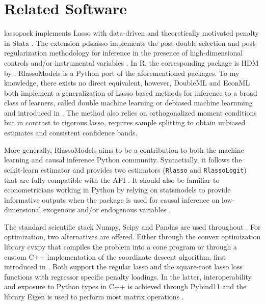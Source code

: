 \documentclass[11pt, reqno]{amsart} \usepackage{pstricks} %
\newcommand{\pkg}[1]{{\fontseries{m}\fontseries{b}\selectfont #1}}
\let\proglang=\textsf
\let\code=\texttt
\begin{document}
\section{Related Software}

\pkg{lassopack} implements Lasso with data-driven and theoretically motivated
penalty in \proglang{Stata} \citep{Ahrens2020}. The extension \pkg{pdslasso}
implements the post-double-selection and post-regularization methodology for
inference in the presence of high-dimensional controls and/or instrumental
variables \citep{Ahrens2019}. In \proglang{R}, the corresponding package is
\pkg{HDM} by \cite{Belloni2014b}. \pkg{RlassoModels} is a \proglang{Python}
port of the aforementioned packages. To my knowledge, there exists no direct
equivalent, however, \pkg{DoubleML} \citep{Bach2021} and \pkg{EconML}
\citep{Battochi2019} both implement a generalization of Lasso based methods for
inference to a broad class of learners, called double machine learning or
debiased machine learnming and introduced in \cite{Chetverikov2016}. The method
also relies on orthogonalized moment conditions but in contrast to rigorous
lasso, requires sample splitting to obtain unbiased estimates and consistent
confidence bands. 

More generally, \pkg{RlassoModels} aims to be a contribution to both the machine
learning and causal inference \proglang{Python} community.  Syntactially, it
follows the \pkg{scikit-learn} estimator and provides two estimators
(\code{Rlasso} and \code{RlassoLogit})  that are fully compatible with the API
\citep{Pedregosa2011}. It should also be familiar to econometricians working in
\proglang{Python} by relying on \pkg{statsmodels} to provide informative
outputs when the package is used for causal inference on low-dimensional
exogenous and/or endogenous variables \citep{Seabold2010}.

The standard scientific stack \pkg{Numpy}, \pkg{Scipy} and \pkg{Pandas} are
used throughout \citep{Van2011, Harris2020, Virtanen2020, Mckinney2011}. For
optimization, two alternatives are offered. Either through the convex
optimization library \pkg{cvxpy} \citep{Diamond2016} that compiles the problem
into a cone program or through a custom \proglang{C++} implementation of the
coordinate descent algorithm, first introduced in \cite{Fu1998}. Both support
the regular lasso and the square-root lasso loss functions with regressor
specific penalty loadings. In the latter, interoperability and exposure to
\proglang{Python} types in \proglang{C++} is achieved through \pkg{Pybind11}
and the library \pkg{Eigen} is used to perform most matrix operations
\citep{Wenzel2017, Guennebaud2014}.
\end{document}
